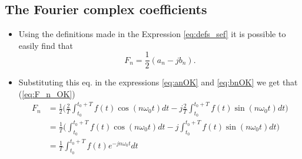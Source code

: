 \subsection{The Fourier complex coefficients}
\begin{itemize}
\item Using the definitions made in the Expression \ref{eq:defs_sef}
  it is possible to easily find that
  \begin{equation}
    F_n = \frac{1}{2}(a_n-jb_n).\tag{F\_n}
    \label{eq:F_n}
  \end{equation}
\item Substituting this eq. in the expressions \ref{eq:anOK} and
  \ref{eq:bnOK} we get that (\ref{eq:F_n_OK})
  \begin{equation}
  \begin{array}{rl}
    F_n & = \displaystyle\frac{1}{2}\Big(\frac{2}{T}\int_{t_0}^{t_0+T}
    f(t)\cos(n\omega_0t)dt -j\frac{2}{T}\int_{t_0}^{t_0+T} f(t)\sin(n\omega_0t)dt
  \Big)\\
   & = \displaystyle\frac{1}{T}\Big(\int_{t_0}^{t_0+T}
   f(t)\cos(n\omega_0t)dt -j\int_{t_0}^{t_0+T} f(t)\sin(n\omega_0t)dt\Big)\\
   & = \displaystyle\frac{1}{T}\int_{t_0}^{t_0+T}f(t)e^{-jn\omega_0t} dt
  \end{array}
  \tag{F\_n\_OK}
  \label{eq:F_n_OK}
  \end{equation}
\end{itemize}

